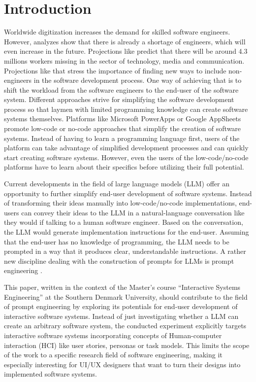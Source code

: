 \documentclass[acsmall,screen]{acmart}
\begin{document}
\section{Introduction}
Worldwide digitization increases the demand for skilled software engineers. However, analyzes show that there is already a shortage of engineers, which will even increase in the future. Projections like \cite{yannick_binvel_85_2018} predict that there will be around 4.3 millions workers missing in the sector of technology, media and communication. Projections like that stress the importance of finding new ways to include non-engineers in the software development process. One way of achieving that is to shift the workload from the software engineers to the end-user of the software system. Different approaches strive for simplifying the software development process so that laymen with limited programming knowledge can create software systems themselves. Platforms like Microsoft PowerApps or Google AppSheets promote low-code or no-code approaches that simplify the creation of software systems. Instead of having to learn a programming language first, users of the platform can take advantage of simplified development processes and can quickly start creating software systems. However, even the users of the low-code/no-code platforms have to learn about their specifics before utilizing their full potential.

Current developments in the field of large language models (LLM) offer an opportunity to further simplify end-user development of software systems. Instead of transforming their ideas manually into low-code/no-code implementations, end-users can convey their ideas to the LLM in a natural-language conversation like they would if talking to a human software engineer. Based on the conversation, the LLM would generate implementation instructions for the end-user. Assuming that the end-user has no knowledge of programming, the LLM needs to be prompted in a way that it produces clear, understandable instructions. A rather new discipline dealing with the construction of prompts for LLMs is prompt engineering \cite{white_prompt_2023}.

This paper, written in the context of the Master’s course “Interactive Systems Engineering” at the Southern Denmark University, should contribute to the field of prompt engineering by exploring its potentials for end-user development of interactive software systems. Instead of just investigating whether a LLM can create an arbitrary software system, the conducted experiment explicitly targets interactive software systems incorporating concepts of Human-computer interaction (HCI) like user stories, personas or task models. This limits the scope of the work to a specific research field of software engineering, making it especially interesting for UI/UX designers that want to turn their designs into implemented software systems.
\end{document}
